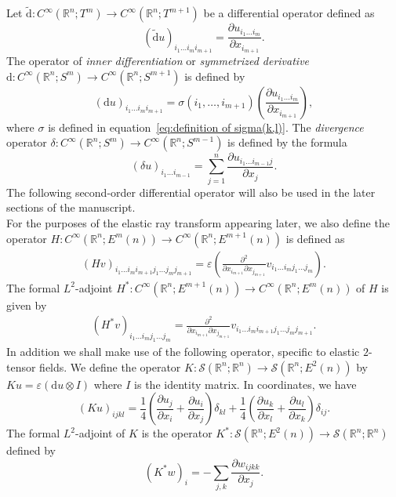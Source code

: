 \documentclass[11pt]{article}
\newcommand{\D}{\mathrm{d}}
\newcommand{\Rb}{\mathbb{R}}
\begin{document}
Let $\tilde{\D}: C^\infty(\Rb^n;T^{m})\rightarrow C^\infty(\Rb^n;T^{m+1})$ be a differential operator defined as
$$(\tilde{\D} u)_{i_1\dots i_mi_{m+1}} = \frac{\partial u_{i_1\dots i_m} }{\partial x_{i_{m+1}}}.$$
The operator of \textit{inner differentiation} or \textit{symmetrized derivative} $\D:C^\infty(\Rb^n;S^m)\rightarrow C^\infty(\Rb^n;S^{m+1})$ is defined by
$$(\D u)_{i_1\dots i_mi_{m+1}} = \sigma(i_1, \dots , i_{m+1}) \left(\frac{\partial u_{i_1\dots i_m} }{\partial x_{i_{m+1}}}\right),$$
where $\sigma$ is defined in equation~\eqref{eq:definition of sigma(k,l)}. The \textit{divergence} operator $\delta:C^\infty(\Rb^n;S^{m})\rightarrow C^\infty(\Rb^n;S^{m-1})$ is defined by the formula $$ (\delta u)_{i_1\dots i_{m-1}} = \sum_{j=1}^n \frac{\partial u_{i_1\dots i_{m-1}j} }{\partial x_{j}}.$$
The following second-order differential operator will also be used in the later sections of the manuscript.\\
For the purposes of the elastic ray transform appearing later, we also define the operator $H: C^\infty(\Rb^n;E^m(n))\rightarrow C^\infty(\Rb^n;E^{m+1}(n))$ is defined as
\begin{align}
    (H v)_{i_1\dots i_mi_{m+1}j_1\dots j_mj_{m+1}} =  \varepsilon \left(\frac{\partial^2}{\partial x_{i_{m+1}}\partial x_{j_{m+1}}}v_{i_1\dots i_mj_1\dots j_m}\right). 
\end{align}
The formal $L^2$-adjoint $H^*: C^\infty(\Rb^n;E^{m+1}(n))\rightarrow C^\infty(\Rb^n;E^{m}(n))$ of $H$ is given by
\begin{align}
    (H^* v)_{i_1\dots i_mj_1\dots j_m} = \frac{\partial^2}{\partial x_{i_{m+1}}\partial x_{j_{m+1}}}v_{i_1\dots i_mi_{m+1}j_1\dots j_mj_{m+1}}.
\end{align}
In addition we shall make use of the following operator, specific to elastic $2$-tensor fields. We define the operator $K \colon \mathcal{S}(\mathbb{R}^n;\Rb^n) \to \mathcal{S}(\mathbb{R}^n;E^2(n))$ by $Ku =\varepsilon(\D u \otimes I)$ where $I$ is the identity matrix. In coordinates, we have
\begin{equation}
(Ku)_{ijkl} =
\frac14
\left(
\frac{\partial u_j}{\partial x_i}
+
\frac{\partial u_i}{\partial x_j}
\right)
\delta_{kl}
+
\frac14
\left(
\frac{\partial u_k}{\partial x_l}
+
\frac{\partial u_l}{\partial x_k}
\right)
\delta_{ij}.
\end{equation}
The formal $L^2$-adjoint of $K$ is the operator $K^* \colon \mathcal{S}(\mathbb{R}^n;E^2(n)) \to \mathcal{S}(\mathbb{R}^n;\Rb^n)$ defined by
\begin{equation}
(K^*w)_i
=
-
\sum_{j,k}
\frac{\partial w_{ijkk}}{\partial x_j}.
\end{equation}
\end{document}
